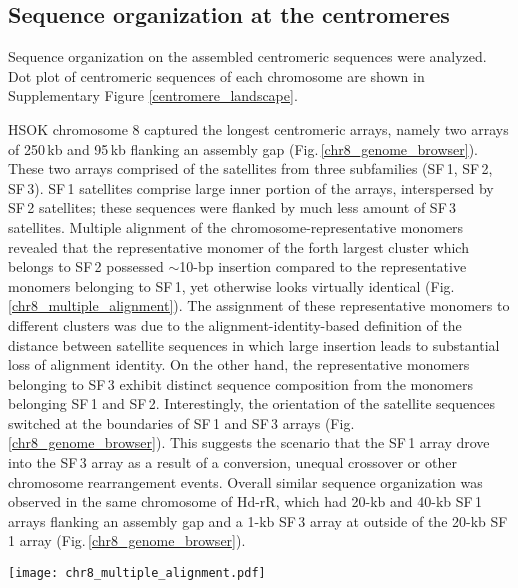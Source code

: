 \subsection*{Sequence organization at the centromeres}
  Sequence organization on the assembled centromeric sequences were analyzed. Dot plot of centromeric sequences of each chromosome are shown in Supplementary Figure \ref{centromere_landscape}.

  HSOK chromosome 8 captured the longest centromeric arrays, namely two arrays of 250\,kb and 95\,kb flanking an assembly gap (Fig.\,\ref{chr8_genome_browser}). These two arrays comprised of the satellites from three subfamilies (SF\,1, SF\,2, SF\,3). SF\,1 satellites comprise large inner portion of the arrays, interspersed by SF\,2 satellites; these sequences were flanked by much less amount of SF\,3 satellites. Multiple alignment of the chromosome-representative monomers revealed that the representative monomer of the forth largest cluster which belongs to SF\,2 possessed $\sim$10-bp insertion compared to the representative monomers belonging to SF\,1, yet otherwise looks virtually identical (Fig.\,\ref{chr8_multiple_alignment}). The assignment of these representative monomers to different clusters was due to the alignment-identity-based definition of the distance between satellite sequences in which large insertion leads to substantial loss of alignment identity. On the other hand, the representative monomers belonging to SF\,3 exhibit distinct sequence composition from the monomers belonging SF\,1 and SF\,2. Interestingly, the orientation of the satellite sequences switched at the boundaries of SF\,1 and SF\,3 arrays (Fig.\,\ref{chr8_genome_browser}). This suggests the scenario that the SF\,1 array drove into the SF\,3 array as a result of a conversion, unequal crossover or other chromosome rearrangement events. Overall similar sequence organization was observed in the same chromosome of Hd-rR, which had 20-kb and 40-kb SF\,1 arrays flanking an assembly gap and a 1-kb SF\,3 array at outside of the 20-kb SF\,1 array (Fig.\,\ref{chr8_genome_browser}).

  \begin{figure*}
    \centering
    \texttt{[image: chr8\_multiple\_alignment.pdf]}
    \caption{
      Multiple sequence alignment of HSOK chromosome 8 representative monomers. 11 representative monomers of HSOK chromosome 8 were aligned using Clustal Omega (version 1.2.3). The labels of each sequence represent cluster index (as a descending order of cluster size), number of monomers belonging to the cluster (in brackets) and belonging subfamilies. Asterisks ("*") indicate the nucleotides shared in all the representative monomers. Representative monomer 4 which belongs to SF\,2 has $\sim$10-bp insertion compared to SF\,1 representative monomers, yet otherwise shares virtually the same sequence composition. SF\,3 representative monomers have distinct sequence composition from SF\1, and SF\2 representative monomers.
    }
    \label{chr8_multiple_alignment}
  \end{figure*}

